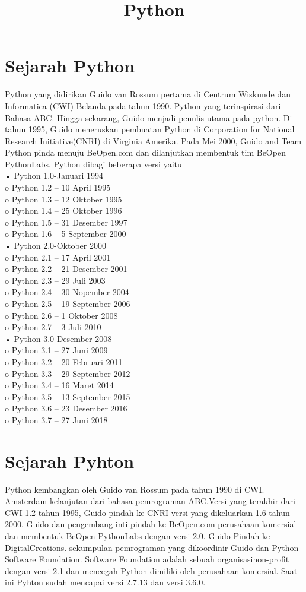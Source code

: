 \documentclass{article}
\title{Python}
\begin{document}
\maketitle

\section{Sejarah Python}
Python yang didirikan Guido van Rossum pertama di Centrum Wiskunde dan Informatica (CWI) Belanda pada tahun 1990. Python yang terinspirasi dari Bahasa ABC. Hingga sekarang, Guido menjadi penulis utama pada python.
Di tahun 1995, Guido meneruskan pembuatan Python di Corporation for National Research Initiative(CNRI) di Virginia Amerika. Pada Mei 2000, Guido and Team Python pinda menuju BeOpen.com dan dilanjutkan membentuk tim BeOpen PythonLabs.
Python dibagi beberapa versi yaitu\\
•	Python 1.0-Januari 1994\\
o	Python 1.2 – 10 April 1995\\
o	Python 1.3 – 12 Oktober 1995\\
o	Python 1.4 – 25 Oktober 1996\\
o	Python 1.5 – 31 Desember 1997\\
o	Python 1.6 – 5 September 2000\\
•	Python 2.0-Oktober 2000\\
o	Python 2.1 – 17 April 2001\\
o	Python 2.2 – 21 Desember 2001\\
o	Python 2.3 – 29 Juli 2003\\
o	Python 2.4 – 30 Nopember 2004\\
o	Python 2.5 – 19 September 2006\\
o	Python 2.6 – 1 Oktober 2008\\
o	Python 2.7 – 3 Juli 2010\\
•	Python 3.0-Desember 2008\\
o	Python 3.1 – 27 Juni 2009\\
o	Python 3.2 – 20 Februari 2011\\
o	Python 3.3 – 29 September 2012\\
o	Python 3.4 – 16 Maret 2014\\
o	Python 3.5 – 13 September 2015\\
o	Python 3.6 – 23 Desember 2016\\
o	Python 3.7 – 27 Juni 2018\\
\section{Sejarah Pyhton}
	Python kembangkan oleh Guido van Rossum pada tahun 1990 di CWI. Amsterdam kelanjutan dari bahasa pemrograman ABC.Versi yang terakhir dari CWI 1.2 tahun 1995, Guido pindah ke CNRI versi yang dikeluarkan 1.6 tahun 2000. Guido dan pengembang inti pindah ke BeOpen.com perusahaan komersial dan membentuk BeOpen PythonLabs dengan versi 2.0. Guido Pindah ke DigitalCreations. sekumpulan pemrograman yang dikoordinir Guido dan Python Software Foundation. Software Foundation adalah sebuah organisasinon-profit dengan versi 2.1 dan mencegah Python dimiliki oleh perusahaan komersial. Saat ini Pyhton sudah mencapai versi 2.7.13 dan versi 3.6.0.
\end{document}
